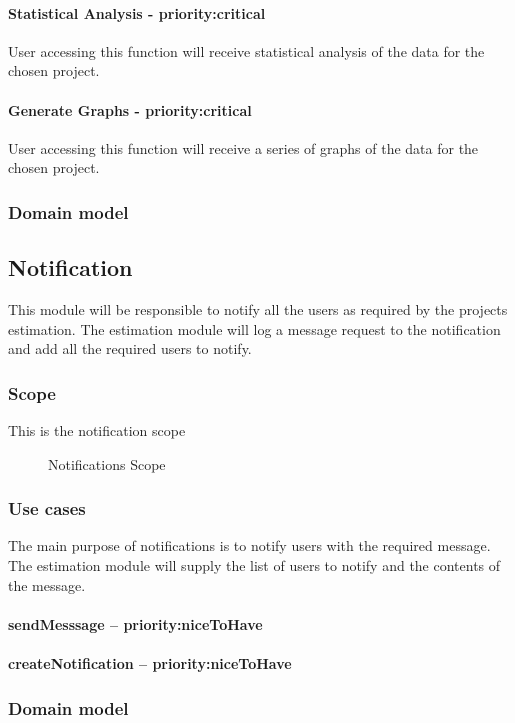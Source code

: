 	\paragraph{Statistical Analysis - priority:critical}
	User accessing this function will receive statistical analysis of the data for the chosen project.

	\paragraph{Generate Graphs - priority:critical}
	User accessing this function will receive a series of graphs of the data for the chosen project. 
\subsubsection{Domain model}

\subsection{Notification}
This module will be responsible to notify all the users as required by the projects estimation. The estimation module will log a message request to the notification and add all the required users to notify.
\subsubsection{Scope}
This is the notification scope
	\begin{figure}[H]
	    	\centering
	    	\caption{Notifications Scope}
	    	\label{fig:Notification_Scope}
   	\end{figure}
\subsubsection{Use cases}
The main purpose of notifications is to notify users with the required message. The estimation module will supply the list of users to notify and the contents of the message.
\paragraph{sendMesssage -- priority:niceToHave}
\paragraph{createNotification -- priority:niceToHave}
\subsubsection{Domain model}
